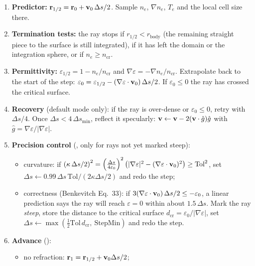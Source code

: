 \begin{enumerate}[itemsep=3pt]
\item \textbf{Predictor:} $\mathbf{r}_{1/2}=\mathbf{r}_0+\mathbf{v}_0\,\Delta s/2$. Sample
      $n_e$, $\nabla n_e$, $T_e$ and the local cell size there.
\item \textbf{Termination tests:} the ray stops if $r_{1/2}<r_\text{body}$ (the
      remaining straight piece to the surface is still integrated), if it has left the
      domain or the integration sphere, or if $n_e\ge n_\text{cr}$.
\item \textbf{Permittivity:} $\varepsilon_{1/2}=1-n_e/n_\text{cr}$ and
      $\nabla\varepsilon=-\nabla n_e/n_\text{cr}$. Extrapolate back to the start of the
      step: $\varepsilon_0=\varepsilon_{1/2}-(\nabla\varepsilon\cdot\mathbf{v}_0)\,\Delta s/2$.
      If $\varepsilon_0\le0$ the ray has crossed the critical surface.
\item \textbf{Recovery} (default mode only): if the ray is over-dense or
      $\varepsilon_0\le0$, retry with $\Delta s/4$. Once $\Delta s<4\,\Delta s_\text{min}$,
      reflect it specularly:
      $\mathbf{v}\leftarrow\mathbf{v}-2(\mathbf{v}\cdot\hat g)\hat g$ with
      $\hat g=\nabla\varepsilon/|\nabla\varepsilon|$.
\item \textbf{Precision control} (, only for rays not yet marked steep):
  \begin{itemize}[itemsep=1pt]
   \item curvature: if $\left(\kappa\,\Delta s/2\right)^2=\left(\frac{\Delta s}{4\varepsilon_0}\right)^2
         \left(|\nabla\varepsilon|^2-(\nabla\varepsilon\cdot\mathbf{v}_0)^2\right)\ge\text{Tol}^2$,
         set $\Delta s\leftarrow0.99\,\Delta s\,\text{Tol}/(2\kappa\Delta s/2)$ and redo
         the step;
   \item correctness (Benkevitch Eq.~33): if
         $3(\nabla\varepsilon\cdot\mathbf{v}_0)\,\Delta s/2\le-\varepsilon_0$, a linear
         prediction says the ray will reach $\varepsilon=0$ within about $1.5\,\Delta s$.
         Mark the ray \emph{steep}, store the distance to the critical surface
         $d_\text{cr}=\varepsilon_0/|\nabla\varepsilon|$, set
         $\Delta s\leftarrow\max(\tfrac12\text{Tol}\,d_\text{cr},\ \text{StepMin})$ and redo
         the step.
  \end{itemize}
\item \textbf{Advance} ():
  \begin{itemize}[itemsep=1pt]
  \item no refraction: $\mathbf{r}_1=\mathbf{r}_{1/2}+\mathbf{v}_0\Delta s/2$;

\end{itemize}
\end{enumerate}
